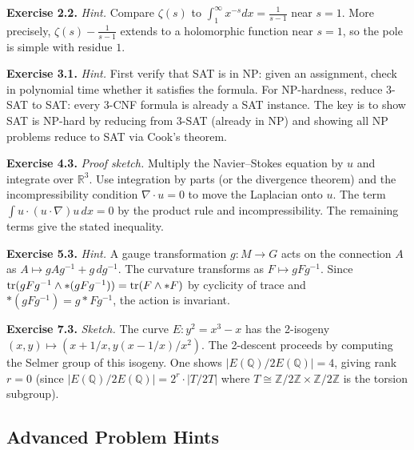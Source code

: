 \medskip\noindent\textbf{Exercise 2.2.} \textit{Hint.} Compare $\zeta(s)$ to $\int_1^\infty x^{-s} dx = \frac{1}{s-1}$ near $s=1$. More precisely, $\zeta(s) - \frac{1}{s-1}$ extends to a holomorphic function near $s=1$, so the pole is simple with residue $1$.

\medskip\noindent\textbf{Exercise 3.1.} \textit{Hint.} First verify that SAT is in NP: given an assignment, check in polynomial time whether it satisfies the formula. For NP-hardness, reduce 3-SAT to SAT: every 3-CNF formula is already a SAT instance. The key is to show SAT is NP-hard by reducing from 3-SAT (already in NP) and showing all NP problems reduce to SAT via Cook's theorem.

\medskip\noindent\textbf{Exercise 4.3.} \textit{Proof sketch.} Multiply the Navier--Stokes equation by $u$ and integrate over $\mathbb{R}^3$. Use integration by parts (or the divergence theorem) and the incompressibility condition $\nabla \cdot u = 0$ to move the Laplacian onto $u$. The term $\int u \cdot (u \cdot \nabla) u \, dx = 0$ by the product rule and incompressibility. The remaining terms give the stated inequality.

\medskip\noindent\textbf{Exercise 5.3.} \textit{Hint.} A gauge transformation $g: M \to G$ acts on the connection $A$ as $A \mapsto gAg^{-1} + g\, dg^{-1}$. The curvature transforms as $F \mapsto gFg^{-1}$. Since $\operatorname{tr}(gFg^{-1} \wedge *(gFg^{-1})) = \operatorname{tr}(F \wedge *F)$ by cyclicity of trace and $*(gFg^{-1}) = g*Fg^{-1}$, the action is invariant.

\medskip\noindent\textbf{Exercise 7.3.} \textit{Sketch.} The curve $E: y^2 = x^3 - x$ has the 2-isogeny $(x,y) \mapsto (x + 1/x, y(x-1/x)/x^2)$. The 2-descent proceeds by computing the Selmer group of this isogeny. One shows $|E(\mathbb{Q})/2E(\mathbb{Q})| = 4$, giving rank $r = 0$ (since $|E(\mathbb{Q})/2E(\mathbb{Q})| = 2^r \cdot |T/2T|$ where $T \cong \mathbb{Z}/2\mathbb{Z} \times \mathbb{Z}/2\mathbb{Z}$ is the torsion subgroup).

\subsection{Advanced Problem Hints}

